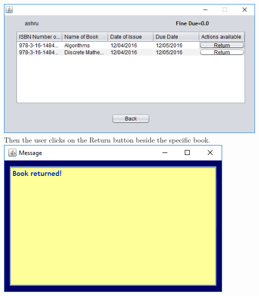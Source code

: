\documentclass{article}
\begin{document}
\begin{enumerate}
\begin{itemize}
\includegraphics[scale = 0.8]{images/UserLogin/Actions/ReturnScreen.PNG}\\
Then the user clicks on the Return button beside the specific book.\\
\includegraphics[scale = 0.8]{images/UserLogin/Actions/BookReturned.PNG}\\


\end{itemize}
\end{enumerate}
\end{document}
